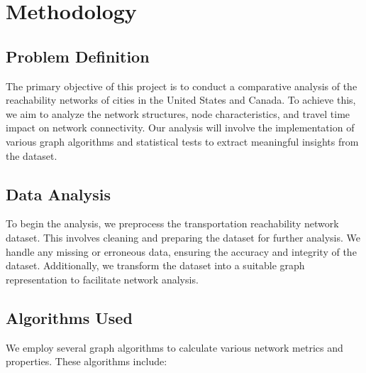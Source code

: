 
\section{Methodology}


\subsection{Problem Definition}

The primary objective of this project is to conduct a comparative analysis of the reachability networks of cities in the United States and Canada. To achieve this, we aim to analyze the network structures, node characteristics, and travel time impact on network connectivity. Our analysis will involve the implementation of various graph algorithms and statistical tests to extract meaningful insights from the dataset.

\subsection{Data Analysis}

To begin the analysis, we preprocess the transportation reachability network dataset. This involves cleaning and preparing the dataset for further analysis. We handle any missing or erroneous data, ensuring the accuracy and integrity of the dataset. Additionally, we transform the dataset into a suitable graph representation to facilitate network analysis.

\subsection{Algorithms Used}

We employ several graph algorithms to calculate various network metrics and properties. These algorithms include:

